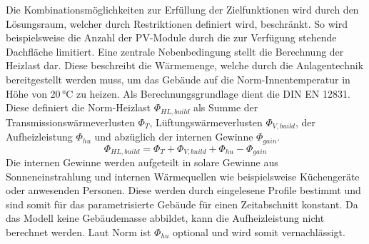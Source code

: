 Die Kombinationsmöglichkeiten zur Erfüllung der Zielfunktionen wird durch den Lösungsraum, welcher durch Restriktionen definiert wird, beschränkt.
So wird beispielsweise die Anzahl der PV-Module durch die zur Verfügung stehende Dachfläche limitiert.
Eine zentrale Nebenbedingung stellt die Berechnung der Heizlast dar.
Diese beschreibt die Wärmemenge, welche durch die Anlagentechnik bereitgestellt werden muss, um das Gebäude auf die Norm-Innentemperatur in Höhe von 20\,°C zu heizen.
Als Berechnungsgrundlage dient die DIN EN 12831.
Diese definiert die Norm-Heizlast \(\Phi_{HL, build}\) als Summe der Transmissionswärmeverlusten \(\Phi_T\), Lüftungswärmeverlusten \(\Phi_{V, build}\), der Aufheizleistung \(\Phi_{hu}\) und abzüglich der internen Gewinne \(\Phi_{gain}\).
\begin{equation}
\label{eq:Gleichung2623}
\Phi_{HL, build} = \Phi_T + \Phi_{V, build} + \Phi_{hu} - \Phi_{gain}
\end{equation}
Die internen Gewinne werden aufgeteilt in solare Gewinne aus Sonneneinstrahlung und internen Wärmequellen wie beispielsweise Küchengeräte oder anwesenden Personen.
Diese werden durch eingelesene Profile bestimmt und sind somit für das parametrisierte Gebäude für einen Zeitabschnitt konstant.
Da das Modell keine Gebäudemasse abbildet, kann die Aufheizleistung nicht berechnet werden.
Laut Norm ist \(\Phi_{hu}\) optional und wird somit vernachlässigt.

